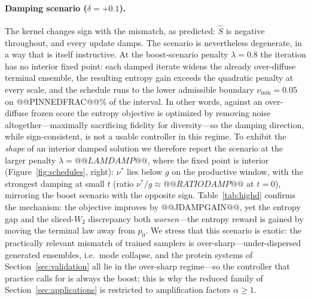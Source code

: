     \paragraph{Damping scenario ($\delta=+0.1$).} The kernel changes sign with the mismatch, as predicted: $\hat S$ is negative throughout, and every update damps. The scenario is nevertheless degenerate, in a way that is itself instructive. At the boost-scenario penalty $\lambda=0.8$ the iteration has no interior fixed point: each damped iterate widens the already over-diffuse terminal ensemble, the resulting entropy gain exceeds the quadratic penalty at every scale, and the schedule runs to the lower admissible boundary $\nu_{\min}=0.05$ on @@PINNEDFRAC@@\% of the interval. In other words, against an over-diffuse frozen score the entropy objective is optimized by removing noise altogether---maximally sacrificing fidelity for diversity---so the damping direction, while sign-consistent, is not a usable controller in this regime. To exhibit the \emph{shape} of an interior damped solution we therefore report the scenario at the larger penalty $\lambda=@@LAMDAMP@@$, where the fixed point is interior (Figure~\ref{fig:schedules}, right): $\nu^*$ lies below $g$ on the productive window, with the strongest damping at small $t$ (ratio $\nu^*/g\approx@@RATIODAMP@@$ at $t=0$), mirroring the boost scenario with the opposite sign. Table~\ref{tab:highd} confirms the mechanism: the objective improves by @@JDAMPGAIN@@, yet the entropy gap and the sliced-$W_2$ discrepancy both \emph{worsen}---the entropy reward is gained by moving the terminal law away from $p_0$. We stress that this scenario is exotic: the practically relevant mismatch of trained samplers is over-sharp---under-dispersed generated ensembles, i.e.\ mode collapse, and the protein systems of Section~\ref{sec:validation} all lie in the over-sharp regime---so the controller that practice calls for is always the boost; this is why the reduced family of Section~\ref{sec:applications} is restricted to amplification factors $\alpha\ge1$.

